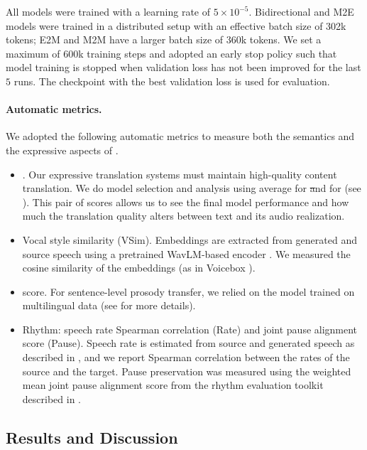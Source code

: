 All models were trained with a learning rate of $5\times10^{-5}$. 
Bidirectional and M2E models were trained in a distributed setup with an effective batch size of 302k tokens; E2M and M2M have a larger batch size of $360$k tokens. We set a maximum of $600$k training steps and adopted an early stop policy such that model training is stopped when validation loss has not been improved for the last $5$ runs. The checkpoint with the best validation loss is used for evaluation.




\paragraph{Automatic metrics.} We adopted the following automatic metrics to measure both the semantics and the expressive aspects of \seamlessexpressive.
\begin{itemize}
    \item \asrbleu. Our expressive translation systems must maintain high-quality content translation. We do model selection and analysis using average \bleu for \st and \asrbleu for \sst (see ). 
    This pair of scores allows us to see the final model performance and how much the translation quality alters between text and its audio realization.
    \item Vocal style similarity (VSim). Embeddings are extracted from generated and source speech using a pretrained WavLM-based encoder \citep{wavlm}. We measured the cosine similarity of the embeddings (as in Voicebox \citep{le2023voicebox}).
    \item \comparator score. 
    For sentence-level prosody transfer, we relied on the \comparator model trained on multilingual data (see  for more details). 
    \item Rhythm: speech rate Spearman correlation (Rate) and joint pause alignment score (Pause). Speech rate is estimated from source and generated speech as described in , and we report Spearman correlation between the rates of the source and the target. Pause preservation was measured using the weighted mean joint pause alignment score from the rhythm evaluation toolkit described in .
\end{itemize}






\subsection{Results and Discussion}
\label{subsec:express_exp}

